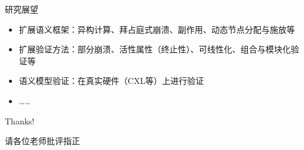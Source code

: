 \documentclass{beamer}
\begin{document}
\begin{frame}{研究展望}
    \begin{itemize}[<+->]
        \item 扩展语义框架：异构计算、拜占庭式崩溃、副作用、动态节点分配与施放等
        \item 扩展验证方法：部分崩溃、活性属性（终止性）、可线性化、组合与模块化验证等
        \item 语义模型验证：在真实硬件（CXL等）上进行验证
        \item ……
    \end{itemize}
\end{frame}


%     
%     

\begin{frame}
    \begin{center}
        {\Huge {}}
    \end{center}
\end{frame}

\begin{frame}
    \begin{center}
        {\Huge\calligra Thanks!}

        \vspace{1em}

        请各位老师批评指正
    \end{center}
\end{frame}
\end{document}
